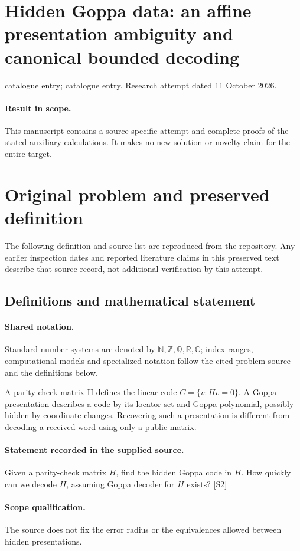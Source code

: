 \documentclass[11pt]{article}
\begin{document}
\section*{Hidden Goppa data: an affine presentation ambiguity and canonical bounded decoding}
\noindent catalogue entry; catalogue entry. Research attempt dated 11 October 2026.
\paragraph{Result in scope.}This manuscript contains a source-specific attempt and complete proofs of the stated auxiliary calculations. It makes no new solution or novelty claim for the entire target.
\section{Original problem and preserved definition}
The following definition and source list are reproduced from the repository. Any earlier inspection dates and reported literature claims in this preserved text describe that source record, not additional verification by this attempt.
\subsection{Definitions and mathematical statement}

\paragraph{Shared notation.}Standard number systems are denoted by $\mathbb N,\mathbb Z,\mathbb Q,\mathbb R,\mathbb C$; index ranges, computational models and specialized notation follow the cited problem source and the definitions below.


A parity-check matrix H defines the linear code $C=\{v:Hv=0\}$. A Goppa presentation describes a code by its locator set and Goppa polynomial, possibly hidden by coordinate changes. Recovering such a presentation is different from decoding a received word using only a public matrix.
\paragraph{Statement recorded in the supplied source.}
Given a parity-check matrix $H$, find the hidden Goppa code in $H$. How quickly can we decode $H$, assuming Goppa decoder for $H$ exists? \href{http://aimpl.org/quantumalg/1/}{[S2]}
\paragraph{Scope qualification.}
The source does not fix the error radius or the equivalences allowed between hidden presentations.
\end{document}
